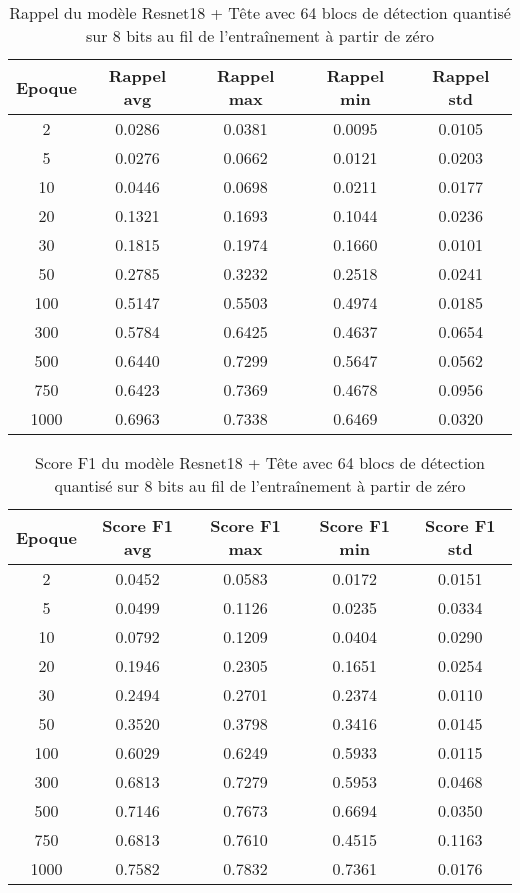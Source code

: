 \begin{table}[!ht]
    \caption{Rappel du modèle Resnet18 + Tête avec 64 blocs de détection quantisé sur 8 bits au fil de l'entraînement à partir de zéro}
    \label{tab:qresnet18+head_64n_rappel_8b_from_scratch}
    \centering
    \begin{tabular}{ |c||c|c|c|c|  }
        \hline
        \rowcolor{gray!50}
        Epoque & Rappel avg & Rappel max & Rappel min & Rappel std\\
        \hline
        2 & 0.0286 & 0.0381 & 0.0095 & 0.0105\\
        5 & 0.0276 & 0.0662 & 0.0121 & 0.0203\\
        10 & 0.0446 & 0.0698 & 0.0211 & 0.0177\\
        20 & 0.1321 & 0.1693 & 0.1044 & 0.0236\\
        30 & 0.1815 & 0.1974 & 0.1660 & 0.0101\\
        50 & 0.2785 & 0.3232 & 0.2518 & 0.0241\\
        100 & 0.5147 & 0.5503 & 0.4974 & 0.0185\\
        300 & 0.5784 & 0.6425 & 0.4637 & 0.0654\\
        500 & 0.6440 & 0.7299 & 0.5647 & 0.0562\\
        750 & 0.6423 & 0.7369 & 0.4678 & 0.0956\\
        1000 & 0.6963 & 0.7338 & 0.6469 & 0.0320\\
        \hline
    \end{tabular}
\end{table}

\begin{table}[!ht]
    \caption{Score F1 du modèle Resnet18 + Tête avec 64 blocs de détection quantisé sur 8 bits au fil de l'entraînement à partir de zéro}
    \label{tab:qresnet18+head_64n_f1score_8b_from_scratch}
    \centering
    \begin{tabular}{ |c||c|c|c|c|  }
        \hline
        \rowcolor{gray!50}
        Epoque & Score F1 avg & Score F1 max & Score F1 min & Score F1 std\\
        \hline
        2 & 0.0452 & 0.0583 & 0.0172 & 0.0151\\
        5 & 0.0499 & 0.1126 & 0.0235 & 0.0334\\
        10 & 0.0792 & 0.1209 & 0.0404 & 0.0290\\
        20 & 0.1946 & 0.2305 & 0.1651 & 0.0254\\
        30 & 0.2494 & 0.2701 & 0.2374 & 0.0110\\
        50 & 0.3520 & 0.3798 & 0.3416 & 0.0145\\
        100 & 0.6029 & 0.6249 & 0.5933 & 0.0115\\
        300 & 0.6813 & 0.7279 & 0.5953 & 0.0468\\
        500 & 0.7146 & 0.7673 & 0.6694 & 0.0350\\
        750 & 0.6813 & 0.7610 & 0.4515 & 0.1163\\
        1000 & 0.7582 & 0.7832 & 0.7361 & 0.0176\\
        \hline
    \end{tabular}
\end{table}


